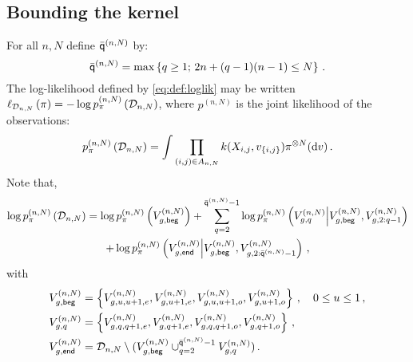 \subsection{Bounding the kernel}
For all $n,N$ define $\bar{\mathsf{q}}^{(n,N)}$ by:
\begin{equation}
\label{eq:ordermax}
\bar{\mathsf{q}}^{(n,N)} = \max\left\{q\ge 1;\, 2n + (q-1)(n-1)\le N\right\}\,.
\end{equation}
The log-likelihood defined by \eqref{eq:def:loglik} may be written $\ell_{\mathcal{D}_{n,N}}\left(\pi\right)= -\log p_{\pi}^{(n,N)}\left(\mathcal{D}_{n,N}\right)$,
where $p^{(n,N)}$ is the joint likelihood of the observations:
\[
p_{\pi}^{(n,N)}\left(\mathcal{D}_{n,N}\right) = \int \prod_{(i,j)\in A_{n,N}}k(X_{i,j},v_{\{i,j\}})\pi^{\otimes N}(\mathrm{d} v) \,.
\]
Note that,
\begin{multline*}
\log p_{\pi}^{(n,N)}\left(\mathcal{D}_{n,N}\right) = \log p_{\pi}^{(n,N)}\left(V_{g,\mathsf{beg}}^{(n,N)}\right) + \sum_{q=2}^{\bar{\mathsf{q}}^{(n,N)}-1}  \log p_{\pi}^{(n,N)}\left(V_{g,q}^{(n,N)}\middle|V_{g,\mathsf{beg}}^{(n,N)},V_{g,2:q-1}^{(n,N)}\right) \\
+  \log p_{\pi}^{(n,N)}\left(V_{g,\mathsf{end}}^{(n,N)}\middle|V_{g,\mathsf{beg}}^{(n,N)},V_{g,2:\bar{\mathsf{q}}^{(n,N)}-1}^{(n,N)}\right)\,,
\end{multline*}
with 
\begin{align*}
V_{g,\mathsf{beg}}^{(n,N)} & = \left\{V_{g,u,u+1,e}^{(n,N)},V_{g,u+1,e}^{(n,N)},V_{g,u,u+1,o}^{(n,N)},V_{g,u+1,o}^{(n,N)}\right\} \,,\quad0\le u\le 1\,,\\
V_{g,q}^{(n,N)}                   & = \left\{V_{g,q,q+1,e}^{(n,N)},V_{g,q+1,e}^{(n,N)},V_{g,q,q+1,o}^{(n,N)},V_{g,q+1,o}^{(n,N)}\right\} \,,\\
V_{g,\mathsf{end}}^{(n,N)} & = \mathcal{D}_{n,N}\setminus (V_{g,\mathsf{beg}}^{(n,N)}\cup_{q=2}^{\bar{\mathsf{q}}^{(n,N)}-1} V_{g,q}^{(n,N)} )\,.
\end{align*}




